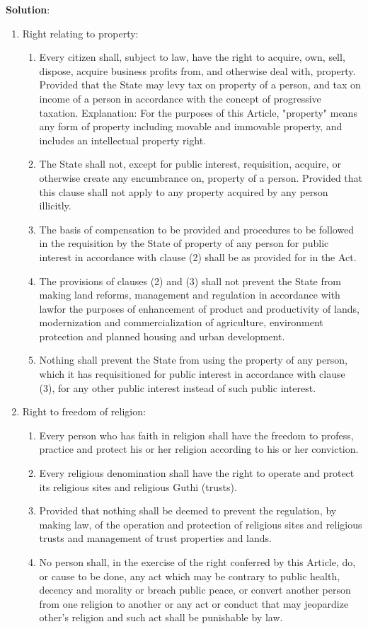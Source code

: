 \documentclass[
]{book}
\newenvironment{solution}{ {\bfseries Solution}:}{}
\begin{document}
\begin{questions}
\begin{solution}
\begin{enumerate}
\item Right relating to property:
\begin{enumerate}
\item Every citizen shall, subject to law, have the right to acquire, own, sell, dispose, acquire business profits from, and otherwise deal with, property. Provided that the State may levy tax on property of a person, and tax on income of a person in accordance with the concept of progressive taxation. Explanation: For the purposes of this Article, "property" means any form of property including movable and immovable property, and includes an intellectual property right.
\item The State shall not, except for public interest, requisition, acquire, or otherwise create any encumbrance on, property of a person. Provided that this clause shall not apply to any property acquired by any person illicitly.
\item The basis of compensation to be provided and procedures to be followed in the requisition by the State of property of any person for public interest in accordance with clause (2) shall be as provided for in the Act.
\item The provisions of clauses (2) and (3) shall not prevent the State from making land reforms, management and regulation in accordance with lawfor the purposes of enhancement of product and productivity of lands, modernization and commercialization of agriculture, environment protection and planned housing and urban development.
\item Nothing shall prevent the State from using the property of any person, which it has requisitioned for public interest in accordance with clause (3), for any other public interest instead of such public interest.
\end{enumerate}

\item Right to freedom of religion:
\begin{enumerate}
\item Every person who has faith in religion shall have the freedom to profess, practice and protect his or her religion according to his or her conviction.
\item Every religious denomination shall have the right to operate and protect its religious sites and religious Guthi (trusts).
\item[] Provided that nothing shall be deemed to prevent the regulation, by making law, of the operation and protection of religious sites and religious trusts and management of trust properties and lands.
\item No person shall, in the exercise of the right conferred by this Article, do, or cause to be done, any act which may be contrary to public health, decency and morality or breach public peace, or convert another person from one religion to another or any act or conduct that may jeopardize other's religion and such act shall be punishable by law.
\end{enumerate}


\end{enumerate}
\end{solution}
\end{questions}
\end{document}

